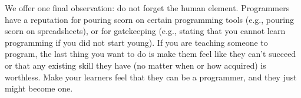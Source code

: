 We offer one final observation: do not forget the human element.
Programmers have a reputation for pouring scorn on certain programming
tools (e.g., pouring scorn on spreadsheets), or for gatekeeping (e.g.,
stating that you cannot learn programming if you did not start young).
If you are teaching someone to program, the last thing you want to do
is make them feel like they can't succeed or that any existing skill
they have (no matter when or how acquired) is worthless.  Make your
learners feel that they can be a programmer, and they just might
become one.
